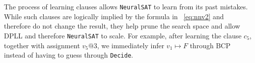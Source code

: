 \documentclass[oneside,11pt,dvipsnames]{book}
\numberwithin{equation}{section}
\theoremstyle{definition}
\theoremstyle{remark}
\newcommand{\tool}{\texttt{NeuralSAT}}
\begin{document}
The process of learning clauses allows \tool{} to learn from its past mistakes.
While such clauses are logically implied by the formula in ~\autoref{eq:nnv2} and therefore do not change the result, they help prune the search space and allow DPLL and therefore \tool{} to scale. For example, after learning the clause $c_5$, together with assignment $v_5@3$, we immediately infer $v_1 \mapsto F$ through BCP instead of having to guess through \texttt{Decide}.







\end{document}
